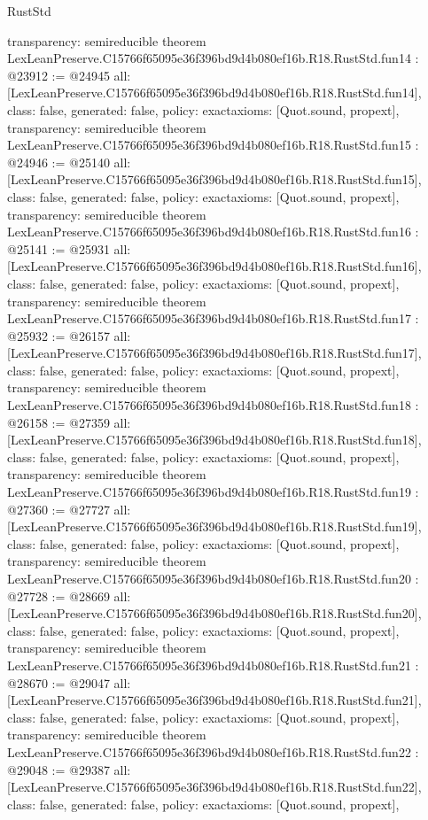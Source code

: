 \begin{lexlean}{RustStd}
\begin{coremodule}
{  transparency: semireducible
}
theorem LexLeanPreserve.C15766f65095e36f396bd9d4b080ef16b.R18.RustStd.fun14 : @23912 := @24945 {
  all: [LexLeanPreserve.C15766f65095e36f396bd9d4b080ef16b.R18.RustStd.fun14],
  class: false,
  generated: false,
  policy: exact{axioms: [Quot.sound, propext]},
  transparency: semireducible
}
theorem LexLeanPreserve.C15766f65095e36f396bd9d4b080ef16b.R18.RustStd.fun15 : @24946 := @25140 {
  all: [LexLeanPreserve.C15766f65095e36f396bd9d4b080ef16b.R18.RustStd.fun15],
  class: false,
  generated: false,
  policy: exact{axioms: [Quot.sound, propext]},
  transparency: semireducible
}
theorem LexLeanPreserve.C15766f65095e36f396bd9d4b080ef16b.R18.RustStd.fun16 : @25141 := @25931 {
  all: [LexLeanPreserve.C15766f65095e36f396bd9d4b080ef16b.R18.RustStd.fun16],
  class: false,
  generated: false,
  policy: exact{axioms: [Quot.sound, propext]},
  transparency: semireducible
}
theorem LexLeanPreserve.C15766f65095e36f396bd9d4b080ef16b.R18.RustStd.fun17 : @25932 := @26157 {
  all: [LexLeanPreserve.C15766f65095e36f396bd9d4b080ef16b.R18.RustStd.fun17],
  class: false,
  generated: false,
  policy: exact{axioms: [Quot.sound, propext]},
  transparency: semireducible
}
theorem LexLeanPreserve.C15766f65095e36f396bd9d4b080ef16b.R18.RustStd.fun18 : @26158 := @27359 {
  all: [LexLeanPreserve.C15766f65095e36f396bd9d4b080ef16b.R18.RustStd.fun18],
  class: false,
  generated: false,
  policy: exact{axioms: [Quot.sound, propext]},
  transparency: semireducible
}
theorem LexLeanPreserve.C15766f65095e36f396bd9d4b080ef16b.R18.RustStd.fun19 : @27360 := @27727 {
  all: [LexLeanPreserve.C15766f65095e36f396bd9d4b080ef16b.R18.RustStd.fun19],
  class: false,
  generated: false,
  policy: exact{axioms: [Quot.sound, propext]},
  transparency: semireducible
}
theorem LexLeanPreserve.C15766f65095e36f396bd9d4b080ef16b.R18.RustStd.fun20 : @27728 := @28669 {
  all: [LexLeanPreserve.C15766f65095e36f396bd9d4b080ef16b.R18.RustStd.fun20],
  class: false,
  generated: false,
  policy: exact{axioms: [Quot.sound, propext]},
  transparency: semireducible
}
theorem LexLeanPreserve.C15766f65095e36f396bd9d4b080ef16b.R18.RustStd.fun21 : @28670 := @29047 {
  all: [LexLeanPreserve.C15766f65095e36f396bd9d4b080ef16b.R18.RustStd.fun21],
  class: false,
  generated: false,
  policy: exact{axioms: [Quot.sound, propext]},
  transparency: semireducible
}
theorem LexLeanPreserve.C15766f65095e36f396bd9d4b080ef16b.R18.RustStd.fun22 : @29048 := @29387 {
  all: [LexLeanPreserve.C15766f65095e36f396bd9d4b080ef16b.R18.RustStd.fun22],
  class: false,
  generated: false,
  policy: exact{axioms: [Quot.sound, propext]},
}
\end{coremodule}
\end{lexlean}
